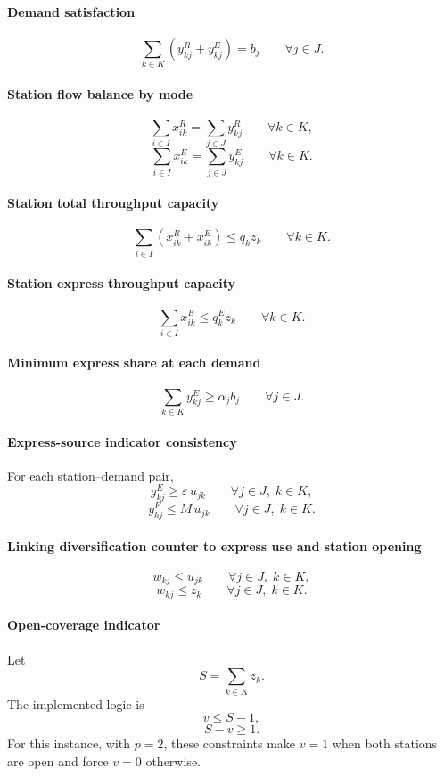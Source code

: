 \paragraph{Demand satisfaction}
\[
\sum_{k\in K}\left(y^{R}_{kj}+y^{E}_{kj}\right)= b_j
\qquad \forall j\in J .
\]

\paragraph{Station flow balance by mode}
\[
\sum_{i\in I} x^{R}_{ik} = \sum_{j\in J} y^{R}_{kj}
\qquad \forall k\in K ,
\]
\[
\sum_{i\in I} x^{E}_{ik} = \sum_{j\in J} y^{E}_{kj}
\qquad \forall k\in K .
\]

\paragraph{Station total throughput capacity}
\[
\sum_{i\in I}\left(x^{R}_{ik}+x^{E}_{ik}\right)\le q_k z_k
\qquad \forall k\in K .
\]

\paragraph{Station express throughput capacity}
\[
\sum_{i\in I} x^{E}_{ik}\le q^{E}_k z_k
\qquad \forall k\in K .
\]

\paragraph{Minimum express share at each demand}
\[
\sum_{k\in K} y^{E}_{kj}\ge \alpha_j b_j
\qquad \forall j\in J .
\]

\paragraph{Express-source indicator consistency}
For each station--demand pair,
\[
y^{E}_{kj}\ge \varepsilon\, u_{jk}
\qquad \forall j\in J,\; k\in K ,
\]
\[
y^{E}_{kj}\le M\, u_{jk}
\qquad \forall j\in J,\; k\in K .
\]

\paragraph{Linking diversification counter to express use and station opening}
\[
w_{kj}\le u_{jk}
\qquad \forall j\in J,\; k\in K ,
\]
\[
w_{kj}\le z_k
\qquad \forall j\in J,\; k\in K .
\]

\paragraph{Open-coverage indicator}
Let
\[
S=\sum_{k\in K} z_k .
\]
The implemented logic is
\[
v \le S-1,
\]
\[
S-v \ge 1.
\]
For this instance, with $p=2$, these constraints make $v=1$ when both stations are open and force $v=0$ otherwise.

